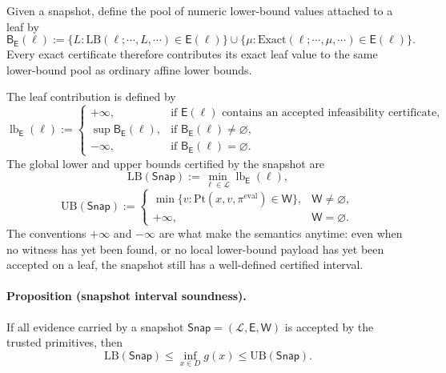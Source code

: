 Given a snapshot, define the pool of numeric lower-bound values attached to a leaf by
\[
\mathsf B_{\mathsf E}(\ell)
:=
\{L: \mathrm{LB}(\ell;\cdots,L,\cdots)\in\mathsf E(\ell)\}
\cup
\{\mu: \mathrm{Exact}(\ell;\cdots,\mu,\cdots)\in\mathsf E(\ell)\}.
\]
Every exact certificate therefore contributes its exact leaf value to the same lower-bound pool as ordinary affine lower bounds.

The leaf contribution is defined by
\begin{equation}
\operatorname{lb}_{\mathsf E}(\ell):=
\begin{cases}
+\infty, & \text{if }\mathsf E(\ell)\text{ contains an accepted infeasibility certificate},\\[2mm]
\sup \mathsf B_{\mathsf E}(\ell), & \text{if }\mathsf B_{\mathsf E}(\ell)\neq\varnothing,\\[2mm]
-\infty, & \text{if }\mathsf B_{\mathsf E}(\ell)=\varnothing.
\end{cases}
\label{eq:appAnew-leaf-contrib}
\end{equation}
The global lower and upper bounds certified by the snapshot are
\begin{equation}
\mathrm{LB}(\mathsf{Snap})
:=
\min_{\ell\in\mathcal L} \operatorname{lb}_{\mathsf E}(\ell),
\label{eq:appAnew-LB}
\end{equation}
\begin{equation}
\mathrm{UB}(\mathsf{Snap})
:=
\begin{cases}
\min\{v: \mathrm{Pt}(x,v,\pi^{\mathrm{eval}})\in\mathsf W\}, & \mathsf W\neq\varnothing,\\[2mm]
+\infty, & \mathsf W=\varnothing.
\end{cases}
\label{eq:appAnew-UB}
\end{equation}
The conventions $+\infty$ and $-\infty$ are what make the semantics anytime: even when no witness has yet been found, or no local lower-bound payload has yet been accepted on a leaf, the snapshot still has a well-defined certified interval.

\paragraph{\normalfont Proposition (snapshot interval soundness).}
If all evidence carried by a snapshot $\mathsf{Snap}=(\mathcal L,\mathsf E,\mathsf W)$ is accepted by the trusted primitives, then
\begin{equation}
\mathrm{LB}(\mathsf{Snap})
\le
\inf_{x\in D} g(x)
\le
\mathrm{UB}(\mathsf{Snap}).
\label{eq:appAnew-interval}
\end{equation}

